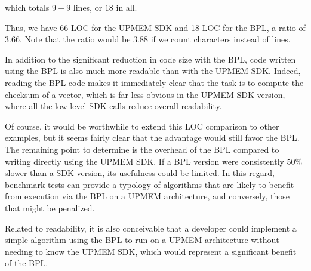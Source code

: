 which totals $9+9$ lines, or $18$ in all. 

Thus, we have 66 LOC for the UPMEM SDK and 18 LOC for the BPL, a ratio of 3.66. Note that the ratio would be 3.88 if we count characters instead of lines.

In addition to the significant reduction in code size with the BPL, code written using the BPL is also much more readable than with the UPMEM SDK. Indeed, reading the BPL code makes it immediately clear that the task is to compute the checksum of a vector, which is far less obvious in the UPMEM SDK version, 
where all the low-level SDK calls reduce overall readability.

Of course, it would be worthwhile to extend this LOC comparison to other examples, but it seems fairly clear that the advantage would still favor the BPL.
The remaining point to determine is the overhead of the BPL compared to writing directly using the UPMEM SDK.  If a BPL version were consistently 50\% slower than a SDK version, its usefulness could be limited. In this regard, benchmark tests can provide a typology of algorithms that are likely to benefit from execution via the BPL on a UPMEM architecture, and conversely, those that might be penalized.

Related to readability, it is also conceivable that a developer could implement a simple algorithm using the BPL to run on a UPMEM architecture  without needing to know the UPMEM SDK, which would represent a significant benefit of the BPL.
